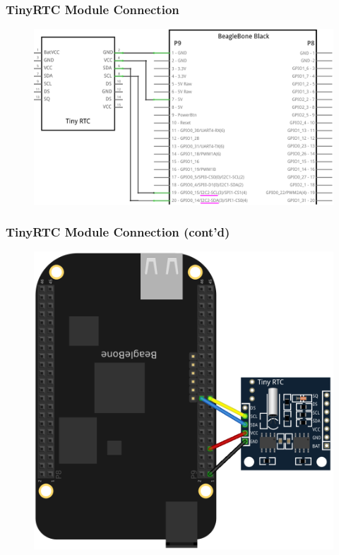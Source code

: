 \documentclass[aspectratio=169,usenames,dvipsnames]{beamer}
\newcounter{cont}
\begin{document}
\begin{frame}
  \frametitle{TinyRTC Module Connection}
  \begin{figure}
    \centering
    \includegraphics[scale=1]{images/bbb-rtc_schem.png}
  \end{figure}
  \vspace*{-12mm}
\end{frame}

\begin{frame}
  \frametitle{TinyRTC Module Connection (cont'd)}
  \begin{figure}
    \centering
    \includegraphics[scale=0.7]{images/bbb-rtc_bb.png}
  \end{figure}
  \vspace*{-12mm}
\end{frame}
\end{document}
